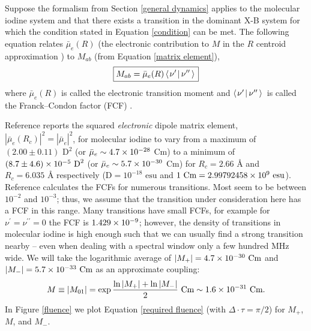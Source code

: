 \label{iodine}
Suppose the formalism from Section \ref{general dynamics} applies to the molecular iodine system and that there exists a transition in the dominant X-B system \cite{Tellinghuisen:1982a} for which the condition stated in Equation \ref{condition} can be met. The following equation relates $\bar{\mu}_e(R)$ (the electronic contribution to $M$ in the $R$ centroid approximation ) to $M_{ab}$ (from Equation \ref{matrix element}),
\begin{equation}
\boxed{
M_{ab}
=
\bar{\mu}_e(R) \left\langle \hspace{0.10em} \nu^{\prime} \hspace{0.10em} \right| \nu^{\prime\prime} \left\rangle \right.
}
\end{equation}
where $\bar{\mu}_e(R)$ is called the electronic transition moment and $\left\langle \hspace{0.10em} \nu^{\prime} \hspace{0.10em} \right| \nu^{\prime\prime} \left\rangle \right.$ is called the Franck--Condon factor (FCF) \cite{Koffend:1979a,Yazykova:1980a,Rapoport:1977a}.

Reference \cite{Lamrini:1993a} reports the squared \emph{electronic} dipole matrix element, $|\bar{\mu}_e(R_c)|^2=|\bar{\mu}_e|^2$, for molecular iodine to vary from a maximum of $(2.00\pm0.11)\mbox{ D}^2$ (or $\bar{\mu}_e \sim 4.7\times10^{-28}$ Cm) to a minimum of $(8.7\pm4.6)\times10^{-5}\mbox{ D}^2$ (or $\bar{\mu}_e \sim 5.7\times10^{-30}$ Cm) for $R_c=2.66\mbox{ \AA}$ and $R_c=6.035\mbox{ \AA}$ respectively ($\mbox{D}=10^{-18}\mbox{ esu}$ and $1\mbox{ Cm}=2.99792458\times10^{9}\mbox{ esu}$). Reference \cite{Tellinghuisen:1978a} calculates the FCFs for numerous transitions. Most seem to be between $10^{-2}$ and $10^{-3}$; thus, we assume that the transition under consideration here has a FCF in this range. Many transitions have small FCFs, for example for $\nu^{\prime}=\nu^{\prime\prime}=0$ the FCF is $1.429\times10^{-9}$; however, the density of transitions in molecular iodine is high enough such that we can usually find a strong transition nearby -- even when dealing with a spectral window only a few hundred MHz wide. We will take the logarithmic average of $|M_{+}|=4.7\times10^{-30}\mbox{ Cm}$ and $|M_{-}|=5.7\times10^{-33}\mbox{ Cm}$ as an approximate coupling:
\begin{equation}
M
\equiv
|M_{01}|
=
\exp{
\frac{\ln{|M_+|}+\ln{|M_-|}}{2}
}\mbox{ Cm}
\sim
1.6\times10^{-31}\mbox{ Cm}.
\end{equation}
 In Figure \ref{fluence} we plot Equation \ref{required fluence} (with $\Delta\cdot\tau=\pi/2$) for $M_+$, $M$, and $M_-$.

